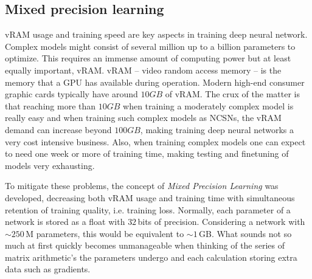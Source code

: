 \subsection{Mixed precision learning} \label{sec:5.3.1}
vRAM usage and training speed are key aspects in training deep neural network. Complex models might consist of several million up to a billion parameters to optimize. This requires an immense amount of computing power but at least equally important, vRAM. vRAM – video random access memory – is the memory that a GPU has available during operation. Modern high-end consumer graphic cards typically have around $10GB$ of vRAM. The crux of the matter is that reaching more than $10GB$ when training a moderately complex model is really easy and when training such complex models as NCSNs, the vRAM demand can increase beyond $100GB$, making training deep neural networks a very cost intensive business. Also, when training complex models one can expect to need one week or more of training time, making testing and finetuning of models very exhausting.

To mitigate these problems, the concept of \textit{Mixed Precision Learning} \cite{mixed_prec} was developed, decreasing both vRAM usage and training time with simultaneous retention of training quality, i.e. training loss. Normally, each parameter of a network is stored as a float with $32$\,bits of precision. Considering a network with $\sim250$\,M parameters, this would be equivalent to $\sim1$\,GB. What sounds not so much at first quickly becomes unmanageable when thinking of the series of matrix arithmetic's the parameters undergo and each calculation storing extra data such as gradients. 

